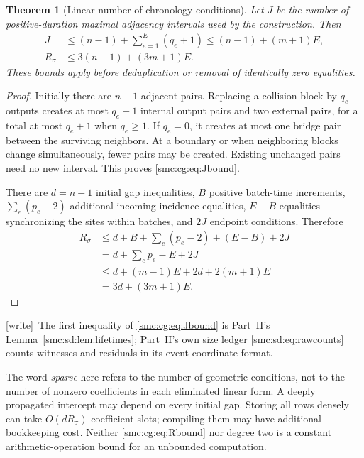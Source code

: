 \documentclass[11pt,letterpaper]{article}
\numberwithin{equation}{section}
\newtheorem{theorem}{Theorem}[section]
\theoremstyle{definition}
\theoremstyle{remark}
\newcommand{\wtag}{\textup{[write]}}
\begin{document}
\begin{theorem}[Linear number of chronology conditions]
\label{smc:cg:thm:rows}
Let $J$ be the number of positive-duration maximal adjacency intervals used
by the construction. Then
\begin{align}
 J&\le (n-1)+\sum_{e=1}^E(q_e+1)
       \le (n-1)+(m+1)E,\label{smc:cg:eq:Jbound}\\
 R_\sigma&\le 3(n-1)+(3m+1)E.\label{smc:cg:eq:Rbound}
\end{align}
These bounds apply before deduplication or removal of identically zero
equalities.
\end{theorem}
\begin{proof}
Initially there are $n-1$ adjacent pairs. Replacing a collision block by $q_e$
outputs creates at most $q_e-1$ internal output pairs and two external pairs,
for a total at most $q_e+1$ when $q_e\ge1$. If $q_e=0$, it creates at most one
bridge pair between the surviving neighbors. At a boundary or when neighboring
blocks change simultaneously, fewer pairs may be created. Existing unchanged
pairs need no new interval. This proves \eqref{smc:cg:eq:Jbound}.

There are $d=n-1$ initial gap inequalities, $B$ positive batch-time
increments, $\sum_e(p_e-2)$ additional incoming-incidence equalities,
$E-B$ equalities synchronizing the sites within batches, and $2J$ endpoint
conditions. Therefore
\begin{align*}
 R_\sigma
 &\le d+B+\sum_e(p_e-2)+(E-B)+2J\\
 &=d+\sum_ep_e-E+2J\\
 &\le d+(m-1)E+2d+2(m+1)E\\
 &=3d+(3m+1)E.
\end{align*}
\end{proof}

\wtag\ The first inequality of \eqref{smc:cg:eq:Jbound} is Part~II's Lemma~\ref{smc:sd:lem:lifetimes}; Part~II's own size ledger \eqref{smc:sd:eq:rawcounts} counts witnesses and residuals in its event-coordinate format.

The word \emph{sparse} here refers to the number of geometric conditions,
not to the number of nonzero coefficients in each eliminated linear form.
A deeply propagated intercept may depend on every initial gap. Storing all
rows densely can take $O(dR_\sigma)$ coefficient slots; compiling them may
have additional bookkeeping cost. Neither \eqref{smc:cg:eq:Rbound} nor degree two
is a constant arithmetic-operation bound for an unbounded computation.
\end{document}
